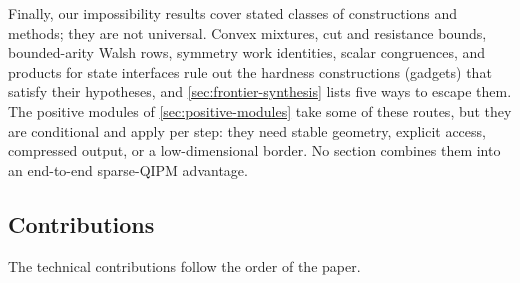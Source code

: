 Finally, our impossibility results cover stated classes of constructions and
methods; they are not universal.  Convex mixtures, cut and resistance bounds,
bounded-arity Walsh rows, symmetry work identities, scalar congruences, and
products for state interfaces rule out the hardness constructions (gadgets)
that satisfy their hypotheses, and \cref{sec:frontier-synthesis} lists five
ways to escape them.  The positive
modules of \cref{sec:positive-modules} take some of these routes, but they
are conditional and apply per step: they need stable geometry, explicit
access, compressed output, or a low-dimensional border.  No section combines
them into an end-to-end sparse-QIPM advantage.

\subsection{Contributions}
\label{sec:introduction-contributions}

The technical contributions follow the order of the paper.

